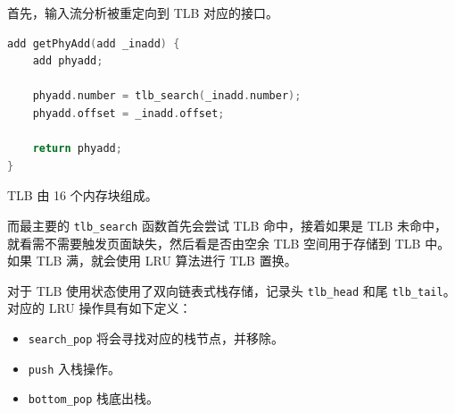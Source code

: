 \documentclass[12pt,a4paper]{article}
\newenvironment{problems}{\begin{list}{}{\renewcommand{\makelabel}[1]{\textbf{##1}\hfil}}}{\end{list}}
\providecommand{\code}[2]{}
\begin{document}
\begin{problems}
    首先，输入流分析被重定向到 TLB 对应的接口。
    \begin{lstlisting}[language=c]
add getPhyAdd(add _inadd) {
    add phyadd;

    phyadd.number = tlb_search(_inadd.number);
    phyadd.offset = _inadd.offset;
    
    return phyadd;
}
    \end{lstlisting}

    TLB 由 16 个内存块组成。
    \code{src/tlb.h}{c}

    而最主要的 \verb"tlb_search" 函数首先会尝试 TLB 命中，接着如果是 TLB 未命中，就看需不需要触发页面缺失，然后看是否由空余 TLB 空间用于存储到 TLB 中。如果 TLB 满，就会使用 LRU 算法进行 TLB 置换。
    \code{src/tlb.c}{c}

    对于 TLB 使用状态使用了双向链表式栈存储，记录头 \verb"tlb_head" 和尾 \verb"tlb_tail"。对应的 LRU 操作具有如下定义：
    \code{src/lru.h}{c}

    \begin{itemize}
        \item \verb"search_pop" 将会寻找对应的栈节点，并移除。
        \item \verb"push" 入栈操作。
        \item \verb"bottom_pop" 栈底出栈。
    \end{itemize}

    \code{src/lru.c}{c}



\end{problems}
\end{document}
